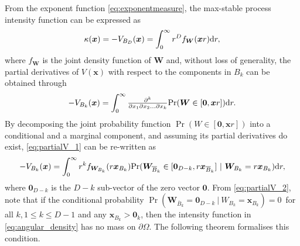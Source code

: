 \documentclass[12pt]{article}
\begin{document}
%
From the exponent function \eqref{eq:exponentmeasure}, the max-stable process intensity function can be expressed as 
\begin{equation}\label{eq:intensity}
	\kappa(\bm x) = -V_{B_D}(\bm x) = \int_0^\infty r^D f_{\bm W}(\bm xr)\text dr,
\end{equation} 
where $f_{\bm W}$ is the joint density function of $\bm W$ and, without loss of generality, the partial derivatives of $V(\bm x)$ with respect to the components in $B_k$ can be obtained through
%
\begin{equation}
\label{eq:partialV_1}
 -V_{B_k}(\bm x) = \int_0^\infty {\textstyle{\partial^k\over\partial x_1\partial x_2\dots \partial x_k}}{\rm Pr}(\bm W \in [\bm 0,\bm xr ])\text dr. 
\end{equation}
%
By decomposing the joint probability function $\Pr(W\in [\bm 0,\bm xr])$ into a conditional and a marginal component, and assuming its partial derivatives do exist, \eqref{eq:partialV_1} can be re-written as
%
\begin{equation}
\label{eq:partialV_2}
 -V_{B_k}(\bm x) = \int_0^\infty r^k f_{\bm W_{B_k}}(r \bm x_{B_k})  \Pr(\bm W_{\bar{B}_k} \in [\bm 0_{D-k},r \bm x_{\bar{B}_k} ]\ |\ \bm W_{B_k} = r \bm x_{B_k} )\text dr,
\end{equation}
%
where $\bm 0_{D-k}$ is the $D-k$ sub-vector of the zero vector $\bm 0$.
From \eqref{eq:partialV_2}, note that if the conditional probability $\Pr(\bm W_{\bar{B}_k} =\bm 0_{D-k}\ |\ W_{B_k} = \bm x_{B_k} )=0$\ for all $k, 1 \leq k \leq D-1$ and any $\bm x_{B_k} > \bm 0_k$, then the intensity function in \eqref{eq:angular_density} has no mass on $\partial\Omega$. The following theorem formalises this condition. 
%
\end{document}
